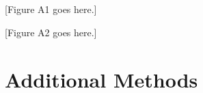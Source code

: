 \documentclass[11pt]{article}
\begin{document}


\renewcommand{\theequation}{A\arabic{equation}}
\renewcommand{\thetable}{A\arabic{table}}
\setcounter{equation}{0}  
\setcounter{figure}{0}
\setcounter{table}{0}

\subsection*{}


[Figure A1 goes here.]


[Figure A2 goes here.]

\subsection*{}

\newpage{}

\section{Additional Methods}

\subsection*{}

\subsection*{}

\newpage{}
\end{document}
